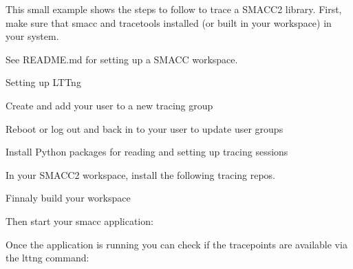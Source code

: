 This small example shows the steps to follow to trace a SMACC2 library. First, make sure that smacc and tracetools installed (or built in your workspace) in your system.

See README.\+md for setting up a SMACC workspace.

Setting up LTTng


\begin{DoxyCode}{0}

\end{DoxyCode}


Create and add your user to a new tracing group


\begin{DoxyCode}{0}

\end{DoxyCode}
 Reboot or log out and back in to your user to update user groups


\begin{DoxyCode}{0}

\end{DoxyCode}
 Install Python packages for reading and setting up tracing sessions


\begin{DoxyCode}{0}

\end{DoxyCode}
 In your SMACC2 workspace, install the following tracing repos.


\begin{DoxyCode}{0}

\end{DoxyCode}
 Finnaly build your workspace


\begin{DoxyCode}{0}

\end{DoxyCode}
 Then start your smacc application\+:


\begin{DoxyCode}{0}

\end{DoxyCode}
 Once the application is running you can check if the tracepoints are available via the lttng command\+:


